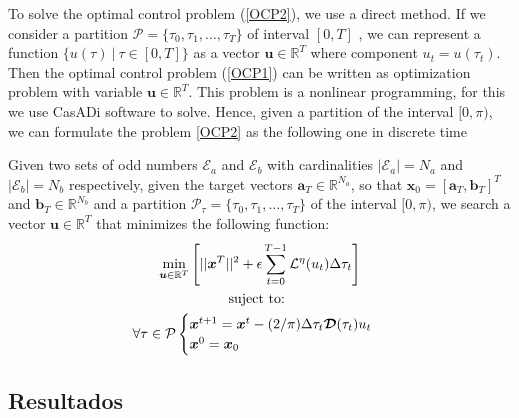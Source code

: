 To solve the optimal control problem (\ref{OCP2}), we use a direct method. 
%
If we consider a partition $\mathcal{P} = \{\tau_0,\tau_1,\dots,\tau_{T}\}$ of interval $[0,T]$ , we can represent a function $\{ u(\tau) \ | \ \tau \in [0,T]\}$ as a vector $\bm{u} \in \mathbb{R}^{T}$ where component $u_t = u(\tau_t)$. 
%
Then the optimal control problem (\ref{OCP1}) can be written as optimization problem with variable $\bm{u} \in \mathbb{R}^{T}$. This problem is a nonlinear programming, for this we use CasADi software to solve. 
%
Hence, given a partition of the interval $[0,\pi)$, we can formulate the problem \ref{OCP2} as the following one in discrete time
\newline

\begin{problem}
Given two sets of odd numbers $\mathcal{E}_a$ and $\mathcal{E}_b$ with cardinalities $|\mathcal{E}_a| = N_a$ and $|\mathcal{E}_b| = N_b$ respectively, given the target vectors $\bm{a}_T  \in \mathbb{R}^{N_a}$, so that $\bm{x}_0 = [\bm{a}_T,\bm{b}_T]^T$ and $\bm{b}_T \in \mathbb{R}^{N_b}$ and a partition $\mathcal{P}_\tau = \{\tau_0,\tau_1,\dots,\tau_{T}\}$ of the interval $[0,\pi)$, we search a vector $\bm{u} \in \mathbb{R}^{T}$ that minimizes the following function:
\begin{gather}
        \min_{\bm{u} \in \mathbb{R}^{T} } 
        \Bigg[ 
        || \bm{x}^{T}||^2
        + \epsilon  \sum_{t=0}^{T-1} \mathcal{L}^\eta(u_{t}) \Delta\tau_t  \Bigg]  \\
        \notag \text{suject to: } \\
        \forall \tau \in \mathcal{P} \begin{cases}
            \bm{x}^{t+1} = \bm{x}^{t} - (2/\pi)\Delta \tau_t \bm{\mathcal{D}}(\tau_t)u_t \\
            \bm{x}^0 = \bm{x}_0
        \end{cases} 
\end{gather}
\end{problem}

\subsection{Resultados}

